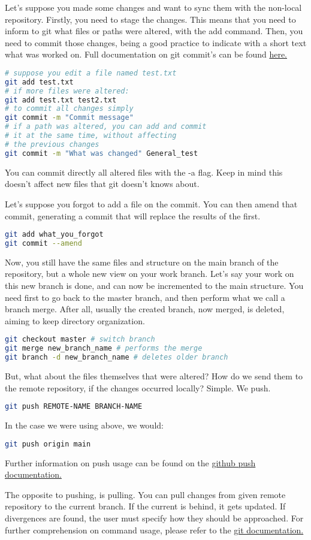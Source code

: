 \documentclass[a4paper,11pt]{article}
\begin{document}
Let's suppose you made some changes and want to sync them with the non-local
repository. Firstly, you need to stage the changes. This means that you need to
inform to git what files or paths were altered, with the add command. Then, you
need to commit those changes, being a good practice to indicate with a short
text what was worked on. Full documentation on git commit's can be found
\href{https://git-scm.com/docs/git-commit}{here.}  
\begin{lstlisting}[language=bash]
# suppose you edit a file named test.txt
git add test.txt
# if more files were altered:
git add test.txt test2.txt
# to commit all changes simply
git commit -m "Commit message"
# if a path was altered, you can add and commit
# it at the same time, without affecting
# the previous changes
git commit -m "What was changed" General_test
\end{lstlisting}
\begin{tipbox}
You can commit directly all altered files with the -a flag. Keep in mind this
doesn't affect new files that git doesn't knows about.
\end{tipbox}
Let's suppose you forgot to add a file on the commit. You can then amend that
commit, generating a commit that will replace the results of the first.
\begin{lstlisting}[language=bash]
git add what_you_forgot
git commit --amend
\end{lstlisting}
Now, you still have the same files and structure on the main branch of the
repository, but a whole new view on your work branch. Let's say your work on
this new branch is done, and can now be incremented to the main structure. You
need first to go back to the master branch, and then perform what we call
a branch merge. After all, usually the created branch, now merged, is deleted,
aiming to keep directory organization.
\begin{lstlisting}[language=bash]
git checkout master # switch branch
git merge new_branch_name # performs the merge
git branch -d new_branch_name # deletes older branch
\end{lstlisting}
But, what about the files themselves that were altered? How do we send them to
the remote repository, if the changes occurred locally? Simple. We push.
\begin{lstlisting}[language=bash]
git push REMOTE-NAME BRANCH-NAME
\end{lstlisting}
In the case we were using above, we would:
\begin{lstlisting}[language=bash]
git push origin main
\end{lstlisting}
Further information on push usage can be found on the
\href{https://docs.github.com/en/get-started/using-git/pushing-commits-to-a-remote-repository}{github
push documentation.} 
\begin{remarkbox}
The opposite to pushing, is pulling. You can pull changes from given remote
repository to the current branch. If the current is behind, it gets updated. If
divergences are found, the user must specify how they should be approached.
For further comprehension on command usage, please refer to the
\href{https://git-scm.com/docs/git-pull}{git documentation.} 
\end{remarkbox}
\end{document}
